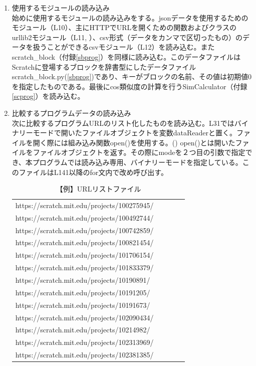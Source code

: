 \documentclass[a4paper,10pt,onecolumn,oneside,openany]{jsbook}
\begin{document}
\begin{enumerate}
 \item  使用するモジュールの読み込み
\\始めに使用するモジュールの読み込みをする。jsonデータを使用するためのモジュール（L10）、主にHTTPでURLを開くための関数およびクラスのurllib2モジュール（L11, \cite{urllib}）、csv形式（データをカンマで区切ったもの）のデータを扱うことができるcsvモジュール（L12）を読み込む。またscratch\_block（付録\ref{sbprog}）を同様に読み込む。このデータファイルはScratchに登場するブロックを辞書型にしたデータファイルscratch\_block.py(\ref{sbprog})であり、キーがブロックの名前、その値は初期値0を指定したものである。最後にcos類似度の計算を行うSimCalculator（付録\ref{scprog}）を読み込む。
 \item 比較するプログラムデータの読み込み
 \\次に比較するプログラムURLのリスト化したものを読み込む。L31ではバイナリーモードで開いたファイルオブジェクトを変数dataReaderと置く。ファイルを開く際には組み込み関数open()を使用する。(\cite{open}) open()とは開いたファイルをファイルオブジェクトを返す。その際にmodeを２つ目の引数で指定でき、本プログラムでは読み込み専用、バイナリーモードを指定している。このファイルはL141以降のfor文内で改め呼び出す。
\begin{table}[h]
 \caption{【例】URLリストファイル}
 \label{urllist}
 \begin{center}
\begin{tabular}{lclcl}
https://scratch.mit.edu/projects/100275945/ \\
https://scratch.mit.edu/projects/100492744/ \\
https://scratch.mit.edu/projects/100742859/ \\
https://scratch.mit.edu/projects/100821454/ \\
https://scratch.mit.edu/projects/101706154/ \\
https://scratch.mit.edu/projects/101833379/ \\
https://scratch.mit.edu/projects/10190891/ \\
https://scratch.mit.edu/projects/10191205/ \\
https://scratch.mit.edu/projects/10191673/ \\
https://scratch.mit.edu/projects/102090434/ \\
https://scratch.mit.edu/projects/10214982/ \\
https://scratch.mit.edu/projects/102313969/ \\
https://scratch.mit.edu/projects/102381385/ \\

\end{tabular}
\end{center}
\end{table}
\end{enumerate}
\end{document}
